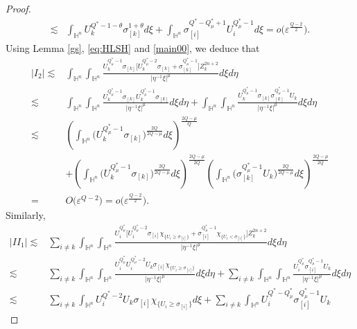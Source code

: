 \documentclass[11pt]{article}
\begin{document}
\begin{proof}
\begin{align}
\lesssim& \int_{\mathbb{H}^{n}}U_k^{Q^{\ast}-1-\theta}\sigma^{1+\theta}_{[k]} d\xi +%
\int_{\mathbb{H}^{n}}\sigma_{[i]}^{Q^{\ast}-Q_\mu^*+1}U_i^{Q^{\ast}_{\mu}-1}d\xi=o\Big(\varepsilon^{\frac{Q-2}{2}}\Big).
\end{align}
Using Lemma \ref{gs}, \eqref{eq:HLSH} and \eqref{main00}, we deduce that
\begin{align}\label{main34}
 |I_2| \lesssim & \int_{\mathbb{H}^{n}}\int_{\mathbb{H}^{n}}\frac{U_k^{Q^{\ast}_{\mu}-1}\sigma_{[k]}\Big[U_k^{Q^{\ast}_{\mu}-2}\sigma_{[k]}
+\sigma_{[k]}^{Q^{\ast}_{\mu}-1}\Big]Z_k^{2n+2}}{|\eta^{-1}\xi|^{\mu}}d\xi{d}\eta \nonumber\\
\lesssim&\int_{\mathbb{H}^{n}}\int_{\mathbb{H}^{n}}\frac{U_k^{Q^{\ast}_{\mu}-1}\sigma_{[k]}U_k^{Q^{\ast}_{\mu}-1}\sigma_{[k]}
}{|\eta^{-1}\xi|^{\mu}}d\xi{d}\eta+\int_{\mathbb{H}^{n}}\int_{\mathbb{H}^{n}}\frac{U_k^{Q^{\ast}_{\mu}-1}\sigma_{[k]}
\sigma_{[k]}^{Q^{\ast}_{\mu}-1}U_k}{|\eta^{-1}\xi|^{\mu}}d\xi{d}\eta \nonumber\\
\lesssim&\left(\int_{\mathbb{H}^{n}}\bigg(U_k^{Q^{\ast}_{\mu}-1}\sigma_{[k]}\bigg)^{\frac{2Q}{2Q-\mu}} d\xi\right)^{\frac{2Q-\mu}{Q}} \nonumber\\
&+\left(\int_{\mathbb{H}^{n}}\bigg(U_k^{Q^{\ast}_{\mu}-1}\sigma_{[k]}\bigg)^{\frac{2Q}{2Q-\mu}} d\xi\right)^{\frac{2Q-\mu}{2Q}}\left(\int_{\mathbb{H}^{n}}\bigg(\sigma_{[k]}^{Q^{\ast}_{\mu}-1}U_k\bigg)^{\frac{2Q}{2Q-\mu}} d\xi\right)^{\frac{2Q-\mu}{2Q}} \nonumber\\
=&O\big(\varepsilon^{Q-2}\big)=o\Big(\varepsilon^{\frac{Q-2}{2}}\Big).
\end{align}
Similarly,
\begin{align}\label{main35}
 |II_1| \lesssim & \sum\limits_{i\neq k} \int_{\mathbb{H}^{n}}\int_{\mathbb{H}^{n}}\frac{U_i^{Q^{\ast}_{\mu}}\Big[U_i^{Q^{\ast}_{\mu}-2}\sigma_{[i]}
\chi_{\{U_i\geq \sigma_{[i]}\}}
+\sigma_{[i]}^{Q^{\ast}_{\mu}-1}\chi_{\{U_i< \sigma_{[i]}\}}\Big]Z_k^{2n+2}}{|\eta^{-1}\xi|^{\mu}}d\xi{d}\eta \nonumber\\
\lesssim& \sum\limits_{i\neq k}\int_{\mathbb{H}^{n}}\int_{\mathbb{H}^{n}}\frac{U_i^{Q^{\ast}_{\mu}}U_i^{Q^{\ast}_{\mu}-2}U_k\sigma_{[i]}
\chi_{\{U_i\geq \sigma_{[i]}\}}
}{|\eta^{-1}\xi|^{\mu}}d\xi{d}\eta+\sum\limits_{i\neq k}\int_{\mathbb{H}^{n}}\int_{\mathbb{H}^{n}}\frac{U_i^{Q^{\ast}_{\mu}}
\sigma_{[i]}^{Q^{\ast}_{\mu}-1}U_k}{|\eta^{-1}\xi|^{\mu}}d\xi{d}\eta \nonumber\\
\lesssim&\sum\limits_{i\neq k} \int_{\mathbb{H}^{n}}U_i^{Q^{\ast}-2}U_k\sigma_{[i]}\chi_{\{U_i\geq \sigma_{[i]}\}}d\xi +\sum\limits_{i\neq k}\int_{\mathbb{H}^{n}}U_i^{Q^{\ast}-Q_\mu^*}\sigma_{[i]}^{Q^{\ast}_{\mu}-1}U_k

\end{align}
\end{proof}
\end{document}
